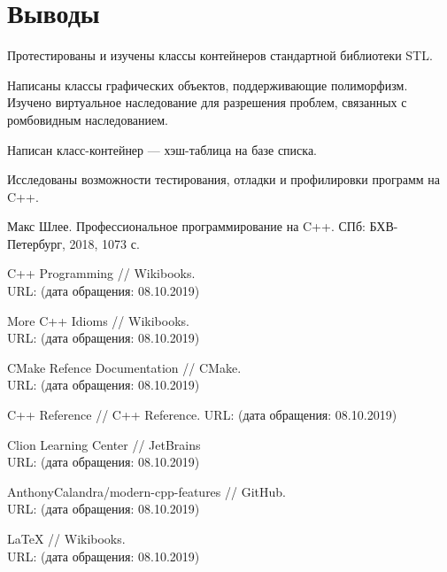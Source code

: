 \documentclass[a4paper, 14pt]{extarticle}
\begin{document}
\section{Выводы}
Протестированы и изучены классы контейнеров стандартной библиотеки STL.\@

Написаны классы графических объектов, поддерживающие полиморфизм. Изучено виртуальное наследование для разрешения проблем, связанных с ромбовидным наследованием.

Написан класс-контейнер --- хэш-таблица на базе списка.

Исследованы возможности тестирования, отладки и профилировки программ на C++.

\begin{thebibliography}{8}

    Макс Шлее. Профессиональное программирование на C++. СПб: БХВ-Петербург, 2018, 1073 с.

    C++ Programming // Wikibooks.\\ URL:\@ {} (дата обращения: 08.10.2019)

    More C++ Idioms // Wikibooks.\\ URL:\@ {} (дата обращения: 08.10.2019)

    CMake Refence Documentation // CMake.\\ URL:\@ {} (дата обращения: 08.10.2019)

    C++ Reference // C++ Reference. URL:\@ {} (дата обращения: 08.10.2019)

    Clion Learning Center // JetBrains\\
    URL:\@ {} (дата обращения: 08.10.2019)

    AnthonyCalandra/modern-cpp-features // GitHub. \\ URL:\@ {} (дата обращения: 08.10.2019)

    \LaTeX{} // Wikibooks.\\URL:\@ {} (дата обращения: 08.10.2019)

\end{thebibliography}
\end{document}
